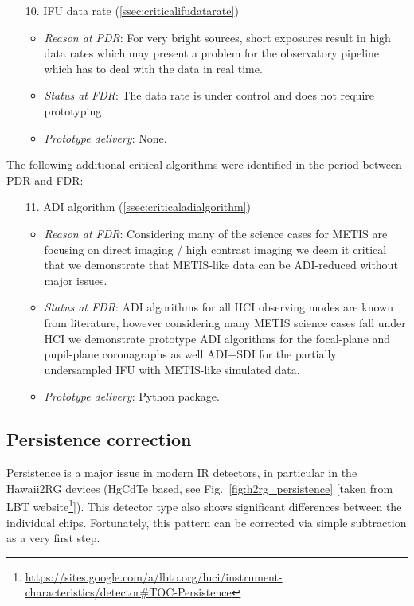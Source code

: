 \begin{enumerate}
\begin{itemize}
    \end{itemize}
    \item[10.] IFU data rate (\ref{ssec:criticalifudatarate})
    \begin{itemize}
        \item \textit{Reason at PDR}: For very bright sources, short exposures result in high data rates which may present a problem for
            the observatory pipeline which has to deal with the data in real time.
        \item \textit{Status at FDR}: The data rate is under control and does not require prototyping.
        \item \textit{Prototype delivery}: None.
    \end{itemize}
\end{enumerate}

The following additional critical algorithms were identified in the period between PDR and FDR:

\begin{enumerate}
    \item[11.] ADI algorithm (\ref{ssec:criticaladialgorithm})
    \begin{itemize}
        \item \textit{Reason at FDR}: Considering many of the science cases for METIS are focusing on direct imaging / high contrast imaging we deem it critical that we demonstrate that METIS-like data can be ADI-reduced without major issues.
        \item \textit{Status at FDR}: ADI algorithms for all HCI observing modes are known from literature, however considering many METIS science cases fall under HCI we demonstrate prototype ADI algorithms for the focal-plane and pupil-plane coronagraphs as well ADI+SDI for the partially undersampled \ac{IFU} with METIS-like simulated data.
        \item \textit{Prototype delivery}: Python package.
    \end{itemize}
\end{enumerate}

\subsection{Persistence correction}
\label{ssec:criticalpersistencecorrection}
\label{sec_persistence_correction}
Persistence is a major issue in modern IR detectors, in particular in the Hawaii2RG devices (HgCdTe based, see Fig.~\ref{fig:h2rg_persistence} [taken from LBT website\footnote{\url{https://sites.google.com/a/lbto.org/luci/instrument-characteristics/detector\#TOC-Persistence}\label{fn:persistence}}]).
This detector type also shows significant differences between the individual chips.
Fortunately, this pattern can be corrected via simple subtraction as a very first step.


